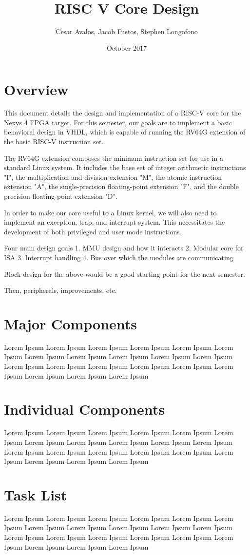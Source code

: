 \documentclass{article}
\title{RISC V Core Design}
\author{Cesar Avalos, Jacob Fustos, Stephen Longofono}
\date{October 2017}
\begin{document}
\maketitle

\section{Overview}
This document details the design and implementation of a RISC-V core for the Nexys 4 FPGA target.  For this semester, our goals are to implement a basic behavioral design in VHDL, which is capable of running the RV64G extension of the basic RISC-V instruction set.

The RV64G extension composes the minimum instruction set for use in a standard Linux system.  It includes the base set of integer arithmetic instructions "I", the multiplication and division extension "M", the atomic instruction extension "A", the single-precision floating-point extension "F", and the double precision floating-point extension "D".

In order to make our core useful to a Linux kernel, we will also need to implement an exception, trap, and interrupt system.  This necessitates the development of both privileged and user mode instructions.

Four main design goals
1. MMU design and how it interacts
2. Modular core for ISA
3. Interrupt handling
4. Bus over which the modules are communicating

Block design for the above would be a good starting point for the next semester.

Then, peripherals, improvements, etc.

\section{Major Components}

Lorem Ipsum Lorem Ipsum Lorem Ipsum Lorem Ipsum Lorem Ipsum Lorem Ipsum Lorem Ipsum Lorem Ipsum Lorem Ipsum Lorem Ipsum Lorem Ipsum Lorem Ipsum Lorem Ipsum Lorem Ipsum Lorem Ipsum Lorem Ipsum Lorem Ipsum Lorem Ipsum Lorem Ipsum Lorem Ipsum

\section{Individual Components}

Lorem Ipsum Lorem Ipsum Lorem Ipsum Lorem Ipsum Lorem Ipsum Lorem Ipsum Lorem Ipsum Lorem Ipsum Lorem Ipsum Lorem Ipsum Lorem Ipsum Lorem Ipsum Lorem Ipsum Lorem Ipsum Lorem Ipsum Lorem Ipsum Lorem Ipsum Lorem Ipsum Lorem Ipsum Lorem Ipsum

\section{Task List}

Lorem Ipsum Lorem Ipsum Lorem Ipsum Lorem Ipsum Lorem Ipsum Lorem Ipsum Lorem Ipsum Lorem Ipsum Lorem Ipsum Lorem Ipsum Lorem Ipsum Lorem Ipsum Lorem Ipsum Lorem Ipsum Lorem Ipsum Lorem Ipsum Lorem Ipsum Lorem Ipsum Lorem Ipsum Lorem Ipsum
\end{document}
